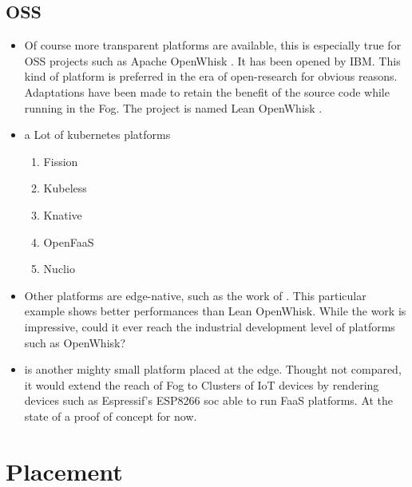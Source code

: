 \documentclass[11pt]{sdm}
\begin{document}
\hypersetup{linkcolor=}
\subsection{\acrfull{OSS}}
\begin{itemize}
    \item Of course more transparent platforms are available, this is especially true for \gls{OSS} projects such as Apache OpenWhisk \cite{noauthor_apache_nodate}. It has been opened by IBM. This kind of platform is preferred in the era of open-research for obvious reasons. Adaptations have been made to retain the benefit of the source code while running in the Fog. The project is named Lean OpenWhisk \cite{breitgand_lean_2018}.
    \item a Lot of kubernetes platforms \begin{enumerate}
        \item Fission
        \item Kubeless
        \item Knative
        \item OpenFaaS
        \item Nuclio
    \end{enumerate}
    \item Other platforms are edge-native, such as the work of \citet{pfandzelter_tinyfaas_2020}. This particular example shows better performances than Lean OpenWhisk. While the work is impressive, could it ever reach the industrial development level of platforms such as OpenWhisk?
    \item \cite{george_nanolambda_2020} is another mighty small platform placed at the edge. Thought not compared, it would extend the reach of Fog to Clusters of IoT devices by rendering devices such as Espressif's ESP8266 soc \cite{noauthor_esp8266_nodate} able to run \gls{FaaS} platforms. At the state of a proof of concept for now.
\end{itemize}


\section{Placement}
\end{document}
